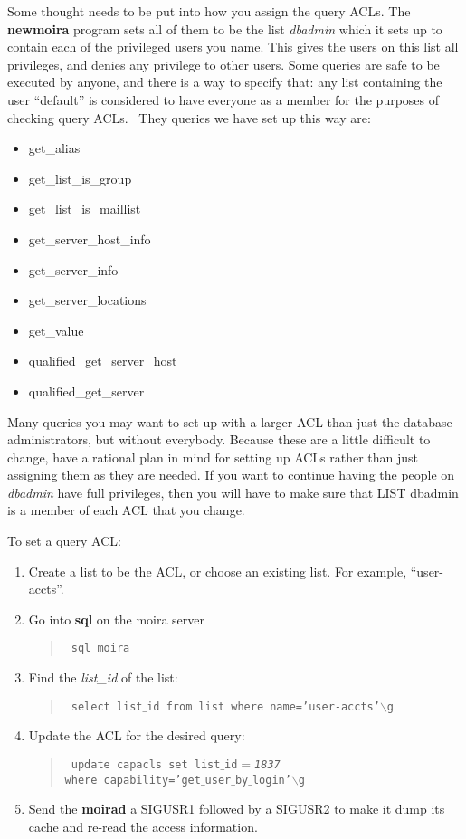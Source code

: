 \documentclass{book}
\begin{document}
Some thought needs to be put into how you assign the query ACLs.  The
{\bf newmoira} program sets all of them to be the list {\em dbadmin} which
it sets up to contain each of the privileged users you name.  This
gives the users on this list all privileges, and denies any privilege
to other users.  Some queries are safe to be executed by anyone, and
there is a way to specify that: any list containing the user
``default'' is considered to have everyone as a member for the
purposes of checking query ACLs.  \athena\ They queries we have set
up this way are:
\begin{itemize}
\item get\_alias
\item get\_list\_is\_group
\item get\_list\_is\_maillist
\item get\_server\_host\_info
\item get\_server\_info
\item get\_server\_locations
\item get\_value
\item qualified\_get\_server\_host
\item qualified\_get\_server
\end{itemize}

Many queries you may want to set up with a larger ACL than just the
database administrators, but without everybody.  Because these are a
little difficult to change, have a rational plan in mind for setting
up ACLs rather than just assigning them as they are needed.  If you
want to continue having the people on {\em dbadmin} have full
privileges, then you will have to make sure that LIST dbadmin is a
member of each ACL that you change.

To set a query ACL:
\begin{enumerate}
\item Create a list to be the ACL, or choose an existing list.  For example,
``user-accts''.
\item Go into {\bf sql} on the moira server
\begin{quotation}\tt
\noindent sql moira
\end{quotation}
\item Find the {\em list\_id} of the list:
\begin{quotation}\tt
\noindent select list$\_$id from list where name='user-accts'$\backslash$g
\end{quotation}
\item Update the ACL for the desired query:
\begin{quotation}\tt
\noindent update capacls set list$\_$id$=${\it 1837} \\
where capability='get$\_$user$\_$by$\_$login'$\backslash$g
\end{quotation}
\item Send the {\bf moirad} a SIGUSR1 followed by a SIGUSR2 to make it
dump its cache and re-read the access information.
\end{enumerate}
\end{document}

